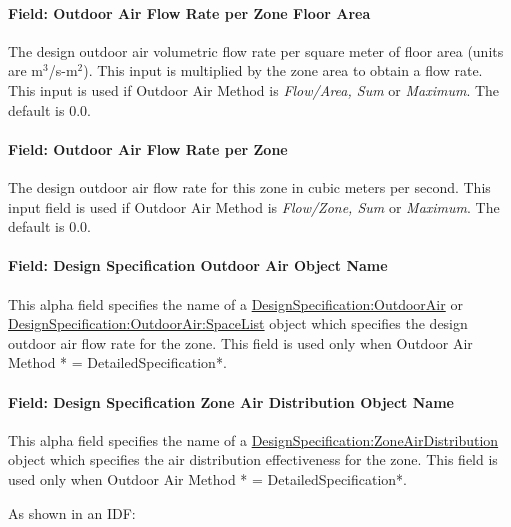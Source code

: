 \paragraph{Field: Outdoor Air Flow Rate per Zone Floor Area}\label{field-outdoor-air-flow-rate-per-zone-floor-area-1}

The design outdoor air volumetric flow rate per square meter of floor area (units are m\(^{3}\)/s-m\(^{2}\)). This input is multiplied by the zone area to obtain a flow rate. This input is used if Outdoor Air Method is \emph{Flow/Area, Sum} or \emph{Maximum}. The default is 0.0.

\paragraph{Field: Outdoor Air Flow Rate per Zone}\label{field-outdoor-air-flow-rate-per-zone-1}

The design outdoor air flow rate for this zone in cubic meters per second. This input field is used if Outdoor Air Method is \emph{Flow/Zone, Sum} or \emph{Maximum}. The default is 0.0.

\paragraph{Field: Design Specification Outdoor Air Object Name}\label{field-design-specification-outdoor-air-object-name-1-000}

This alpha field specifies the name of a \hyperref[designspecificationoutdoorair]{DesignSpecification:OutdoorAir} or \hyperref[designspecificationoutdoorairspacelist]{DesignSpecification:OutdoorAir:SpaceList} object which specifies the design outdoor air flow rate for the zone. This field is used only when Outdoor Air Method * = DetailedSpecification*.

\paragraph{Field: Design Specification Zone Air Distribution Object Name}\label{field-design-specification-zone-air-distribution-object-name-000}

This alpha field specifies the name of a \hyperref[designspecificationzoneairdistribution]{DesignSpecification:ZoneAirDistribution} object which specifies the air distribution effectiveness for the zone. This field is used only when Outdoor Air Method * = DetailedSpecification*.

As shown in an IDF:

